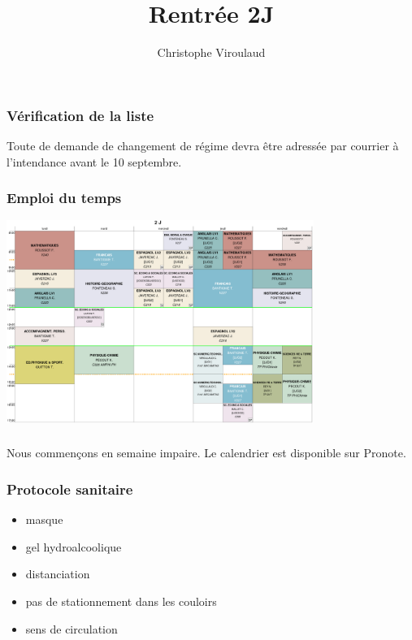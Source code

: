 \documentclass[svgnames,11pt]{beamer}
\author[]{Christophe Viroulaud}
\title{Rentrée 2J}
\date{\framebox{\textbf{}}}
\institute{Seconde - SNT}
\begin{document}
\begin{frame}
    \titlepage
\end{frame}
\begin{frame}
    \frametitle{Vérification de la liste}

    \begin{aretenir}[Remarque]
        Toute de demande de changement de régime devra être adressée par courrier à l'intendance avant le 10 septembre.
    \end{aretenir}

\end{frame}
\begin{frame}
    \frametitle{Emploi du temps}

    \begin{center}
        \centering
        \includegraphics[width=10cm]{2j2021.png}
    \end{center}
\end{frame}
\begin{frame}
    \frametitle{}


    \begin{aretenir}[remarque]
        Nous commençons en semaine impaire. Le calendrier est disponible sur Pronote.
    \end{aretenir}

\end{frame}
\begin{frame}
    \frametitle{Protocole sanitaire}

    \begin{itemize}
        \item masque
        \item gel hydroalcoolique
        \item distanciation
        \item pas de stationnement dans les couloirs
        \item sens de circulation
    \end{itemize}

\end{frame}
\end{document}
